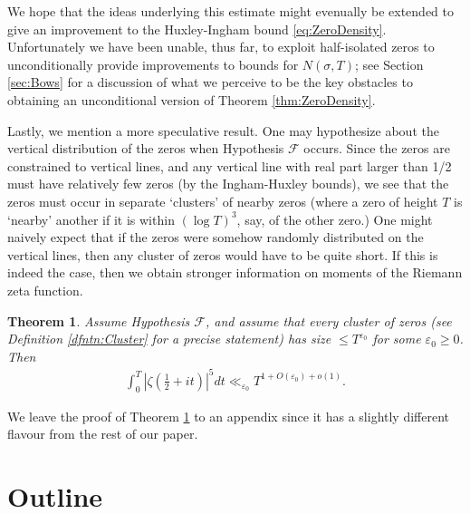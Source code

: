 \documentclass[12pt]{amsart}
\theoremstyle{plain}
\newtheorem{theorem}{Theorem}
\theoremstyle{definition}
\theoremstyle{remark}
\begin{document}
We hope that the ideas underlying this estimate might evenually be extended to give an improvement to the Huxley-Ingham bound \eqref{eq:ZeroDensity}. Unfortunately we have been unable, thus far, to exploit half-isolated zeros to unconditionally provide improvements to bounds for $N(\sigma,T)$; see Section \ref{sec:Bows} for a discussion of what we perceive to be the key obstacles to obtaining an unconditional version of Theorem \ref{thm:ZeroDensity}.

Lastly, we mention a more speculative result. One may hypothesize about the vertical distribution of the zeros when Hypothesis $\mathcal{F}$ occurs. Since the zeros are constrained to vertical lines, and any vertical line with real part larger than 1/2 must have relatively few zeros (by the Ingham-Huxley bounds), we see that the zeros must occur in separate `clusters' of nearby zeros (where a zero of height $T$ is `nearby' another if it is within $(\log{T})^3$, say, of the other zero.) One might naively expect that if the zeros were somehow randomly distributed on the vertical lines, then any cluster of zeros would have to be quite short. If this is indeed the case, then we obtain stronger information on moments of the Riemann zeta function.
%
%
%
%
\begin{theorem}\label{thm:FifthMoment}
Assume Hypothesis $\mathcal{F}$, and assume that every cluster of zeros (see Definition \ref{dfntn:Cluster} for a precise statement) has size $\leq T^{\varepsilon_0}$ for some $\varepsilon_0 \geq 0$. Then
\begin{align*}
\int_0^T |\zeta(\tfrac{1}{2}+it)|^5 dt \ll_{\varepsilon_0} T^{1+O(\varepsilon_0)+o(1)}.
\end{align*}
\end{theorem}
%
%
%
%
We leave the proof of Theorem \ref{thm:FifthMoment} to an appendix since it has a slightly different flavour from the rest of our paper.
%
%
%
%
\section{Outline}
%
%
%
%
\end{document}
